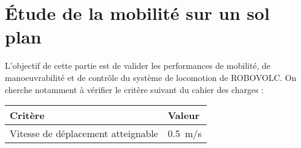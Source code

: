 % 
% 
\section{Étude de la mobilité sur un sol plan \label{sec_2}}


\begin{obj}
L'objectif de cette partie est de valider les performances de mobilité, de manoeuvrabilité et
de contrôle du système de locomotion de ROBOVOLC. On cherche notamment à vérifier le
critère suivant du cahier des charges :

\begin{center}
\begin{tabular}{ll}
\hline
\textbf{Critère} & \textbf{Valeur} \\ \hline 
Vitesse de déplacement atteignable &   \SI{0,5}{m/s} \\\hline
\end{tabular}
\end{center}

\end{obj}



